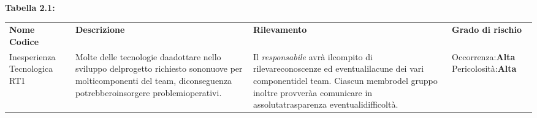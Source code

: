\begin{center}
    \textbf{Tabella 2.1: }\\
    \vspace{10px}
    \begin{table}[h!]
    \centering
    \renewcommand{\arraystretch}{1.8}
    \begin{tabular}{p{60px} p{150px} p{150px} p{60px}}
        \rowcolor{logo!70} \textbf{Nome Codice} & \textbf{Descrizione} & \textbf{Rilevamento} & \textbf{Grado di rischio}\\
        Inesperienza Tecnologica RT1 & Molte delle tecnologie daadottare nello sviluppo delprogetto richiesto sononuove per molticomponenti del team, diconseguenza potrebberoinsorgere problemioperativi. & Il \emph{responsabile} avrà ilcompito di rilevareconoscenze ed eventualilacune dei vari componentidel team. Ciascun membrodel gruppo inoltre provveràa comunicare in assolutatrasparenza eventualidifficoltà. & Occorrenza:\textbf{Alta} Pericolosità:\textbf{Alta} \\  
    \end{tabular}
\end{table}
\end{center}
